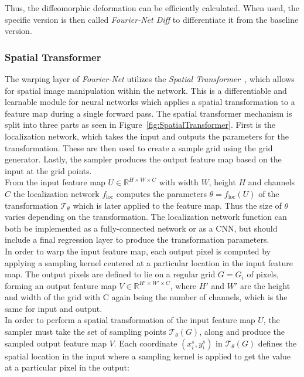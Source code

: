 Thus, the diffeomorphic deformation can be efficiently calculated. When used, the specific version is then called \emph{Fourier-Net Diff} to differentiate it from the baseline version.


\subsubsection{Spatial Transformer} \label{SubSubSec:SpatialTransformer}
The warping layer of \emph{Fourier-Net} utilizes the \emph{Spatial Transformer}~\cite{SpatialTransformer}, which allows for spatial image manipulation within the network. This is a differentiable and learnable module for neural networks which applies a spatial transformation to a feature map during a single forward pass. The spatial transformer mechanism is split into three parts as seen in Figure~\ref{fig:SpatialTransformer}. First is the localization network, which takes the input and outputs the parameters for the transformation. These are then used to create a sample grid using the grid generator. Lastly, the sampler produces the output feature map based on the input at the grid points.\\
From the input feature map $U \in \mathbb{R}^{H \times W \times C}$ with width $W$, height $H$ and channels $C$ the localization network $f_{\text{loc}}$ computes the parameters $\theta = f_{\text{loc}}(U)$ of the transformation $\mathcal{T}_\theta$ which is later applied to the feature map. Thus the size of $\theta$ varies depending on the transformation. 
The localization network function can both be implemented as a fully-connected network or as a CNN, but should include a final regression layer to produce the transformation parameters.\\
In order to warp the input feature map, each output pixel is computed by applying a sampling kernel centered at a particular location in the input feature map. The output pixels are defined to lie on a regular grid $G = {G_i}$ of pixels, forming an output feature map $V \in \mathbb{R}^{H' \times W' \times C}$, where $H'$ and $W'$ are the height and width of the grid with C again being the number of channels, which is the same for input and output.\\
In order to perform a spatial transformation of the input feature map $U$, the sampler must take the set of sampling points $\mathcal{T}_\theta(G)$, along and produce the sampled output feature map $V$. Each coordinate $(x_i^s, y_i^s)$ in $\mathcal{T}_\theta(G)$ defines the spatial location in the input where a sampling kernel is applied to get the value at a particular pixel in the output:
